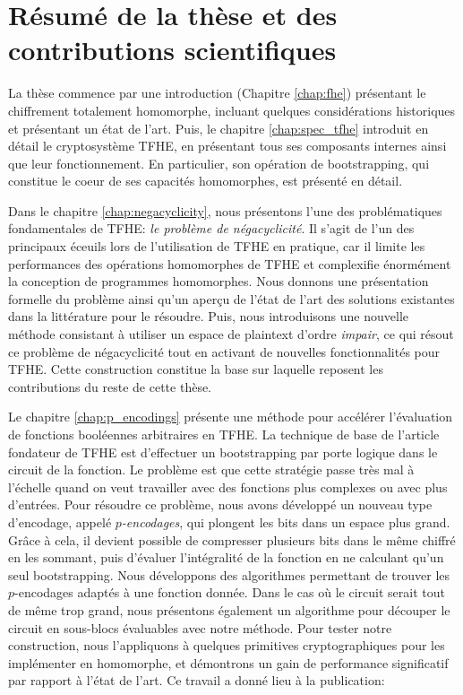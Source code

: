 \section*{Résumé de la thèse et des contributions scientifiques}

La thèse commence par une introduction (Chapitre \ref{chap:fhe}) présentant le chiffrement totalement homomorphe, incluant quelques considérations historiques et présentant un état de l’art. Puis, le chapitre \ref{chap:spec_tfhe} introduit en détail le cryptosystème TFHE, en présentant tous ses composants internes ainsi que leur fonctionnement. En particulier, son opération de bootstrapping, qui constitue le coeur de ses capacités homomorphes, est présenté en détail.


Dans le chapitre \ref{chap:negacyclicity}, nous présentons l'une des problématiques fondamentales de TFHE: \textit{le problème de négacyclicité}. Il s'agit de l’un des principaux éceuils lors de l'utilisation de TFHE en pratique,  car il limite les performances des opérations homomorphes de TFHE et complexifie énormément la conception de programmes homomorphes. Nous donnons une présentation formelle du problème ainsi qu’un aperçu de l’état de l’art des solutions existantes dans la littérature pour le résoudre. Puis, nous introduisons une nouvelle méthode consistant à utiliser un espace de plaintext d'ordre \textit{impair}, ce qui résout ce problème de négacyclicité tout en activant de nouvelles fonctionnalités pour TFHE. Cette construction constitue la base sur laquelle reposent les contributions du reste de cette thèse.


Le chapitre \ref{chap:p_encodings} présente une méthode pour accélérer l’évaluation de fonctions booléennes arbitraires en TFHE. La technique de base de l'article fondateur de TFHE est d'effectuer un bootstrapping par porte logique dans le circuit de la fonction. Le problème est que cette stratégie passe très mal à l'échelle quand on veut travailler avec des fonctions plus complexes ou avec plus d'entrées. Pour résoudre ce problème, nous avons développé un nouveau type d'encodage, appelé \textit{$p$-encodages}, qui plongent les bits dans un espace plus grand. Grâce à cela, il devient possible de compresser plusieurs bits dans le même chiffré en les sommant, puis d'évaluer l'intégralité de la fonction en ne calculant qu'un seul bootstrapping. Nous développons des algorithmes permettant de trouver les $p$-encodages adaptés à une fonction donnée. Dans le cas où le circuit serait tout de même trop grand, nous présentons également un algorithme pour découper le circuit en sous-blocs évaluables avec notre méthode. Pour tester notre construction, nous l'appliquons à quelques primitives cryptographiques pour les implémenter en homomorphe, et démontrons un gain de performance significatif par rapport à l’état de l’art.
Ce travail a donné lieu à la publication:

